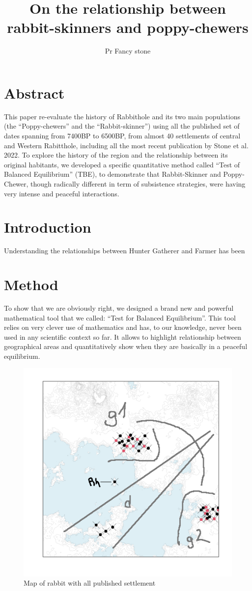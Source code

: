 \documentclass[10pt]{paper}
\title{ On the relationship between rabbit-skinners and poppy-chewers }
\author{Pr Fancy stone}
\begin{document}
\section*{Abstract}
This paper re-evaluate the history of Rabbithole and its two main populations (the ``Poppy-chewers'' and the ``Rabbit-skinner'') using all the published set of dates spanning from 7400BP to 6500BP, from almost 40 settlements of central and Western Rabitthole, including all the most recent publication by Stone et al. 2022. To explore the history of the region and the relationship between its original habitants, we developed a specific quantitative method called ``Test of Balanced Equilibrium'' (TBE), to demonstrate that Rabbit-Skinner and Poppy-Chewer, though radically different in term of subsistence strategies, were having very intense and peaceful interactions.

\section{Introduction}
Understanding the relationships between Hunter Gatherer and Farmer has been  
\section{Method}

\pagebreak


To show that we are obviously right, we designed a brand new and powerful mathematical tool that we called: ``Test for Balanced Equilibrium''. This tool relies on very clever use of mathematics and has, to our knowledge, never been used in any scientific context so far. It allows to highlight relationship between geographical areas and quantitatively show when they are basically in a peaceful equilibrium.

\begin{figure}[hbp]

    \centering
    \includegraphics[width=.65\textwidth]{all_gpe.png}
    \caption{Map of rabbit with all published settlement}
    \label{fig:newage}
\end{figure}
\end{document}
